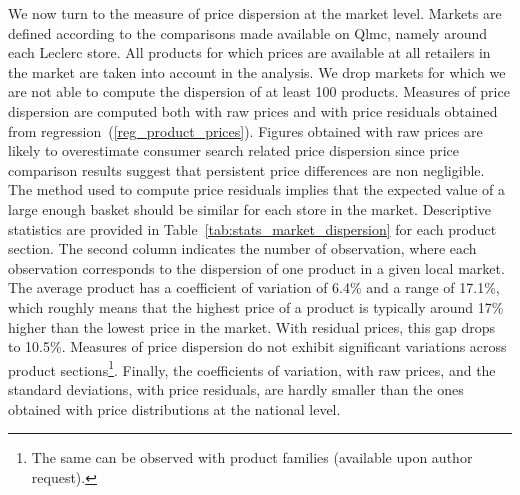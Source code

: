 \documentclass[english]{article}
\begin{document}
We now turn to the measure of price dispersion at the market level. Markets are defined according to the comparisons made available on Qlmc, namely around each Leclerc store. All products for which prices are available at all retailers in the market are taken into account in the analysis. We drop markets for which we are not able to compute the dispersion of at least 100 products. Measures of price dispersion are computed both with raw prices and with price residuals obtained from regression~(\ref{reg_product_prices}). Figures obtained with raw prices are likely to overestimate consumer search related price dispersion since price comparison results suggest that persistent price differences are non negligible. The method used to compute price residuals implies that the expected value of a large enough basket should be similar for each store in the market. Descriptive statistics are provided in Table~\ref{tab:stats_market_dispersion} for each product section. The second column indicates the number of observation, where each observation corresponds to the dispersion of one product in a given local market. The average product has a coefficient of variation of 6.4\% and a range of 17.1\%, which roughly means that the highest price of a product is typically around 17\% higher than the lowest price in the market. With residual prices, this gap drops to 10.5\%. Measures of price dispersion do not exhibit significant variations across product sections\footnote{The same can be observed with product families (available upon author request).}. Finally, the coefficients of variation, with raw prices, and the standard deviations, with price residuals, are hardly smaller than the ones obtained with price distributions at the national level.
\end{document}
